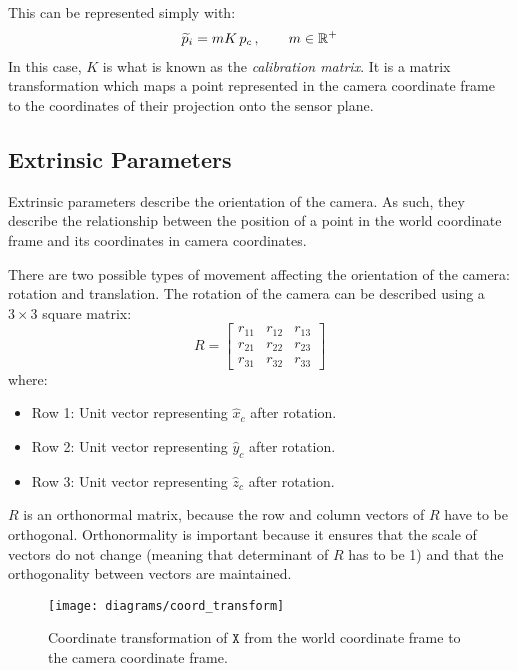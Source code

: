 This can be represented simply with:
\begin{gather}
    \widetilde{p}_i = mK\, p_c\,, \qquad m \in \mathbb{R}^+ \label{eq:pi}
\end{gather}
In this case, $K$ is what is known as the \emph{calibration matrix}. It is a matrix transformation which maps a point represented in the camera coordinate frame to the coordinates of their projection onto the sensor plane.

\subsection{Extrinsic Parameters} \label{sec:extrinsics}

Extrinsic parameters describe the orientation of the camera. As such, they describe the relationship between the position of a point in the world coordinate frame and its coordinates in camera coordinates.

There are two possible types of movement affecting the orientation of the camera: rotation and translation. The rotation of the camera can be described using a $3 \times 3$ square matrix:
\begin{equation}
    R =
    \begin{bmatrix}
        r_{11} & r_{12} & r_{13} \\
        r_{21} & r_{22} & r_{23} \\
        r_{31} & r_{32} & r_{33}
    \end{bmatrix}
\end{equation}
\noindent where:
\begin{itemize}
    \item Row 1: Unit vector representing $\hat{x}_c$ after rotation.
    \item Row 2: Unit vector representing $\hat{y}_c$ after rotation.
    \item Row 3: Unit vector representing $\hat{z}_c$ after rotation.
\end{itemize}
$R$ is an orthonormal matrix, because the row and column vectors of $R$ have to be orthogonal. Orthonormality is important because it ensures that the scale of vectors do not change (meaning that determinant of $R$ has to be 1) and that the orthogonality between vectors are maintained. 

\begin{figure}[H]
    \centering
    \texttt{[image: diagrams/coord\_transform]}
    \caption{Coordinate transformation of $\mathtt{X}$ from the world coordinate frame to the camera coordinate frame.}
    \label{fig:ext}
\end{figure}

